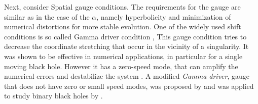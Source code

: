 Next, consider Spatial gauge conditions.
The requirements for the gauge are similar as in the case of the $\alpha$, 
namely hyperbolicity and minimization of numerical distortions for more stable evolution.  
One of the widely used shift conditions is so called 
Gamma driver condition \citep{Alcubierre:2002kk}, 
%
%
This gauge condition tries to decrease the coordinate stretching that occur in the 
vicinity of a singularity. It was shown to be effective in numerical applications, 
in particular for a single moving black hole. However it has a zero-speed mode, 
that can amplify the numerical errors and destabilize the system \citep{vanMeter:2006vi}.
%
A modified \textit{Gamma driver}, gauge that does not have zero or small speed modes,
%
%
was proposed by \citet{vanMeter:2006vi} and was applied to study binary black holes by \citet{Campanelli:2005dd}.












%

